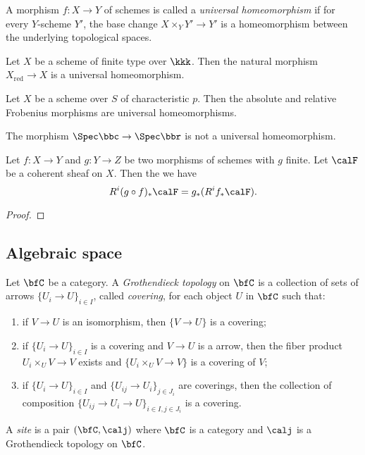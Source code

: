     \begin{definition}\label{def:universally_homeomorphism}
        A morphism \(f: X \to Y\) of schemes is called a \emph{universal homeomorphism} 
        if for every \(Y\)-scheme \(Y'\), the base change \(X \times_Y Y' \to Y'\) is a homeomorphism between the underlying topological spaces.
    \end{definition}

    \begin{example}\label{eg:universal_homeomorphism}
        Let \(X\) be a scheme of finite type over \(\kkk\).
        Then the natural morphism \(X_{\text{red}} \to X\) is a universal homeomorphism.

        Let \(X\) be a scheme over \(S\) of characteristic \(p\).
        Then the absolute and relative Frobenius morphisms are universal homeomorphisms.

        The morphism \(\Spec \bbc \to \Spec \bbr\) is not a universal homeomorphism.
    \end{example}

    \begin{lemma}\label{lem:degeneration_of_Grothendieck_spectral_sequence}
        Let \(f: X \to Y\) and \(g: Y \to Z\) be two morphisms of schemes with \(g\) finite.
        Let \(\calF\) be a coherent sheaf on \(X\).
        Then the we have 
        \[ R^i(g \circ f)_* \calF = g_*(R^if_* \calF). \]
    \end{lemma}
    \begin{proof}
    \end{proof}


\subsection{Algebraic space}

    \begin{definition}\label{def:Grothendieck_topology_and_site}
        Let \(\bfC\) be a category.
        A \emph{Grothendieck topology} on \(\bfC\) is a collection of sets of arrows \(\{U_i \to U\}_{i \in I}\), called \emph{covering}, for each object \(U\) in \(\bfC\) such that:
        \begin{enumerate}
            \item if \(V \to U\) is an isomorphism, then \(\{V \to U\}\) is a covering;
            \item if \(\{U_i \to U\}_{i \in I}\) is a covering and \(V \to U\) is a arrow, then the fiber product \(U_i \times_U V \to V\) exists and \(\{U_i \times_U V \to V\}\) is a covering of \(V\);
            \item if \(\{U_i \to U\}_{i \in I}\) and \(\{U_{ij} \to U_{i}\}_{j \in J_i}\) are coverings, then the collection of composition \(\{U_{ij} \to U_i \to U\}_{i\in I, j\in J_i}\) is a covering.
        \end{enumerate}
        A \emph{site} is a pair \((\bfC, \calj)\) where \(\bfC\) is a category and \(\calj\) is a Grothendieck topology on \(\bfC\).
    \end{definition}


